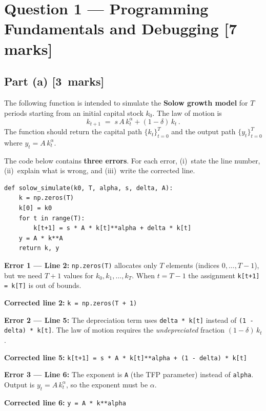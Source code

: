 \documentclass[11pt,a4paper]{article}
\newcommand{\mkpts}[1]{\hfill\textbf{[#1~marks]}}
\begin{document}

\section*{Question 1 --- Programming Fundamentals and Debugging \hfill [7 marks]}

\subsection*{Part (a) \mkpts{3}}

The following function is intended to simulate the \textbf{Solow growth model} for $T$ periods starting from an initial capital stock $k_0$.  The law of motion is
\[
k_{t+1} \;=\; s\,A\,k_t^{\alpha} + (1-\delta)\,k_t\,.
\]
The function should return the capital path $\{k_t\}_{t=0}^{T}$ and the output path $\{y_t\}_{t=0}^{T}$ where $y_t = A\,k_t^{\alpha}$.

\medskip

The code below contains \textbf{three errors}.  For each error, (i)~state the line number, (ii)~explain what is wrong, and (iii)~write the corrected line.

\begin{lstlisting}
def solow_simulate(k0, T, alpha, s, delta, A):
    k = np.zeros(T)
    k[0] = k0
    for t in range(T):
        k[t+1] = s * A * k[t]**alpha + delta * k[t]
    y = A * k**A
    return k, y
\end{lstlisting}

\begin{solution}
\textbf{Error 1 --- Line 2:} \texttt{np.zeros(T)} allocates only $T$ elements (indices $0,\dots,T{-}1$), but we need $T{+}1$ values for $k_0,k_1,\dots,k_T$.  When $t=T{-}1$ the assignment \texttt{k[t+1] = k[T]} is out of bounds.

\textbf{Corrected line 2:} \texttt{k = np.zeros(T + 1)}

\medskip

\textbf{Error 2 --- Line 5:} The depreciation term uses \texttt{delta * k[t]} instead of \texttt{(1 - delta) * k[t]}.  The law of motion requires the \emph{undepreciated} fraction $(1-\delta)\,k_t$.

\textbf{Corrected line 5:} \texttt{k[t+1] = s * A * k[t]**alpha + (1 - delta) * k[t]}

\medskip

\textbf{Error 3 --- Line 6:} The exponent is \texttt{A} (the TFP parameter) instead of \texttt{alpha}.  Output is $y_t = A\,k_t^{\alpha}$, so the exponent must be $\alpha$.

\textbf{Corrected line 6:} \texttt{y = A * k**alpha}
\end{solution}
\end{document}
